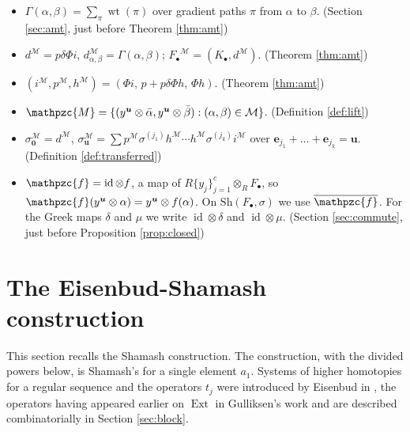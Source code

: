\documentclass[12pt]{amsart}
\theoremstyle{plain}
\theoremstyle{definition}
\newcommand{\F}{ {F_\bullet} }
\newcommand{\M}{\mathcal{M}}
\newcommand{\lift}[1]{\mathpzc{#1}}
\newcommand{\id}{\operatorname{id}}
\newcommand{\Sh}{\mathrm{Sh}}
\newcommand{\wt}{\operatorname{wt}}
\newcommand{\cbl}{\color{blue}}
\begin{document}
\begin{itemize}[leftmargin=*,itemsep=0pt,parsep=0pt]
    \item $\Gamma(\alpha, \beta) = \sum_\pi \wt(\pi)$ over gradient paths $\pi$ from $\alpha$ to $\beta$. {\cbl (Section \ref{sec:amt}, just before Theorem \ref{thm:amt})}
    \item $d^{\M} = p \delta \Phi i$, $d^{\M}_{\alpha,\beta} = \Gamma(\alpha, \beta)$; $\F^{\M} = (K_\bullet, d^{\M})$. {\cbl (Theorem \ref{thm:amt})}
    \item $(i^{\M}, p^{\M}, h^{\M}) = (\Phi i, \, p + p \delta \Phi h, \, \Phi h)$. {\cbl (Theorem \ref{thm:amt})}
    \item $\lift{M} = \{(y^{\boldsymbol{u}} \otimes \bar\alpha, y^{\boldsymbol{u}} \otimes \bar\beta) : (\alpha, \beta) \in \M\}$. {\cbl (Definition \ref{def:lift})}
    \item $\sigma^{\M}_{\boldsymbol{0}} = d^{\M}$, $\sigma^{\M}_{\boldsymbol{u}} = \sum p^{\M} \sigma^{(j_1)} h^{\M} \cdots h^{\M} \sigma^{(j_k)} i^{\M}$ over $\boldsymbol{e}_{j_1} + \dots + \boldsymbol{e}_{j_k} = \boldsymbol{u}$. {\cbl (Definition \ref{def:transferred})}
    \item $\lift{f} = \id \otimes f$, a map of $R\{y_j\}_{j=1}^{c} \otimes_R \F$, so $\lift{f}(y^{\boldsymbol{u}} \otimes \alpha) = y^{\boldsymbol{u}} \otimes f(\alpha)$. On $\Sh(\F, \sigma)$ we use $\overline{\lift{f}}$. For the Greek maps $\delta$ and $\mu$ we write $\id \otimes \delta$ and $\id \otimes \mu$. {\cbl (Section \ref{sec:commute}, just before Proposition \ref{prop:closed})}
\end{itemize}

\section{The Eisenbud-Shamash construction}\label{sec:shamash}
This section recalls the Shamash construction. The construction, with the divided powers below, is Shamash's \cite{Shamash} for a single element $a_1$. Systems of higher homotopies for a regular sequence and the operators $t_j$ were introduced by Eisenbud in \cite{Eisenbud1980}, the operators having appeared earlier on $\operatorname{Ext}$ in Gulliksen's work \cite{Gulliksen} and are described combinatorially in Section \ref{sec:block}.
\end{document}
